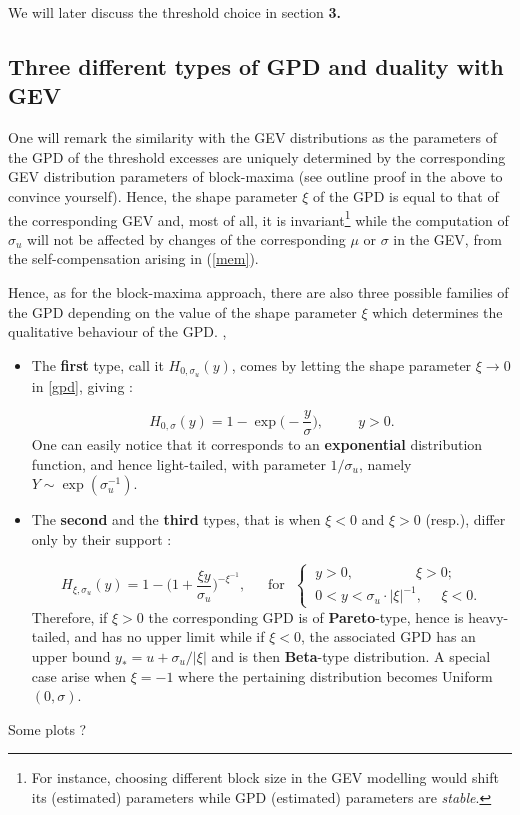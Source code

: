\documentclass[11pt,a4paper,openany ]{book}
\begin{document}
We will later discuss the threshold choice in section \textbf{3.}


\subsection{Three different types of GPD and duality with GEV} One will remark the similarity with the GEV distributions as the parameters of the GPD of the threshold excesses are uniquely determined by the corresponding GEV distribution parameters of block-maxima (see outline proof in the above to convince yourself). Hence, the shape parameter $\xi$ of the GPD is equal to that of the corresponding GEV and, most of all, it is invariant\footnote{For instance, choosing different block size in the GEV modelling would shift its (estimated) parameters while GPD  (estimated) parameters are \emph{stable}. } while the computation of $\sigma_u$ will not be affected by changes of the corresponding $\mu$ or $\sigma$ in the GEV, from the self-compensation arising in (\ref{mem}). \cite[pp.76]{coles_introduction_2001}

Hence, as for the block-maxima approach, there are also three possible families of the GPD depending on the value of the shape parameter $\xi$ which determines the qualitative behaviour of the GPD. \cite{hosking_parameter_1987}, \cite{singh_parameter_1995}

\begin{itemize}
	\item The \textbf{first} type, call it $H_{0,\sigma_u}(y)$, comes by letting the shape parameter $\xi\rightarrow 0$ in \ref{gpd}, giving :
	
	\begin{equation}\label{gpd0}
	H_{0,\sigma}(y)=1-\exp
	\Big(-\frac{y}{\sigma}\Big), \ \ \ \ \ \ \ \ \ \ \ y>0.
	\end{equation}
	One can easily notice that it corresponds to an \textbf{exponential} distribution 
	function, and hence light-tailed, with parameter $1/ \sigma_u$, namely 
	$Y\sim\exp(\sigma_u^{-1})$.
	
	\item The \textbf{second} and the \textbf{third} types, that is when $\xi<0$ and $\xi>0$ (resp.), differ only by their support : 
	
	\begin{equation}\label{gpdm}
	H_{\xi,\sigma_u}(y)=1-\bigg(1+\frac{\xi y}{\sigma_u}\bigg)^{-\xi^{-1}}, \ \ \ \ \  \ \ \text{for} \ \ \ \begin{cases}
	\ y>0,  \ \ \ \ \ \ \ \ \ \ \ \ \ \ \ \  \ \ \ \ \xi>0; \\
	\  0<y<\sigma_u\cdot|\xi|^{-1}, \ \ \ \  \  \  \xi<0.
	\end{cases}
	\end{equation}
	Therefore, if $\xi>0$ the corresponding GPD is of \textbf{Pareto}-type, hence is heavy-tailed, and has no upper limit while if $\xi<0$, the associated GPD has an upper bound $y_*=u+\sigma_u/|\xi|$ and is then \textbf{Beta}-type distribution. A special case arise when $\xi=-1$ where the pertaining distribution becomes Uniform$(0,\sigma)$. \cite[pp.186]{grimshaw_computing_1993}
	
	
\end{itemize}
Some plots ? 
\end{document}
